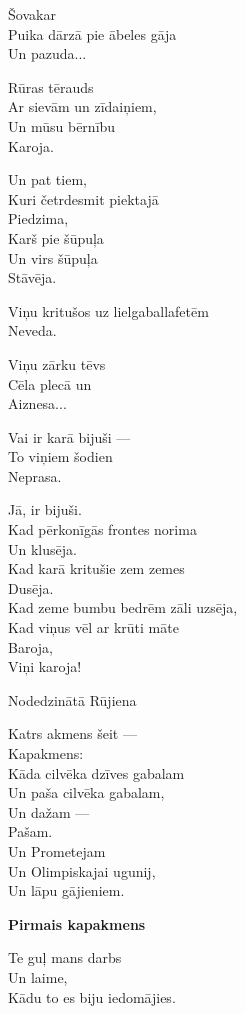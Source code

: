 \documentclass[14pt]{extarticle}
\begin{document}
Šovakar\\
Puika dārzā pie ābeles gāja\\
Un pazuda...

Rūras tērauds\\
Ar sievām un zīdaiņiem,\\
Un mūsu bērnību\\
Karoja.

Un pat tiem,\\
Kuri četrdesmit piektajā\\
Piedzima,\\
Karš pie šūpuļa\\
Un virs šūpuļa\\
Stāvēja.

Viņu kritušos uz lielgaballafetēm\\
Neveda.

Viņu zārku tēvs\\
Cēla plecā un\\
Aiznesa...

Vai ir karā bijuši ---\\
To viņiem šodien\\
Neprasa.

Jā, ir bijuši.\\
Kad pērkonīgās frontes norima\\
Un klusēja.\\
Kad karā kritušie zem zemes\\
Dusēja.\\
Kad zeme bumbu bedrēm zāli uzsēja,\\
Kad viņus vēl ar krūti māte\\
Baroja,\\
Viņi karoja!



\newpage

{\large \sc Nodedzinātā Rūjiena}

Katrs akmens šeit ---\\
Kapakmens:\\
Kāda cilvēka dzīves gabalam\\
Un paša cilvēka gabalam,\\
Un dažam ---\\
Pašam.\\
Un Prometejam\\
Un Olimpiskajai ugunij,\\
Un lāpu gājieniem.

\newpage

{\bf Pirmais kapakmens}

Te guļ mans darbs\\
Un laime,\\
Kādu to es biju iedomājies.
\end{document}

